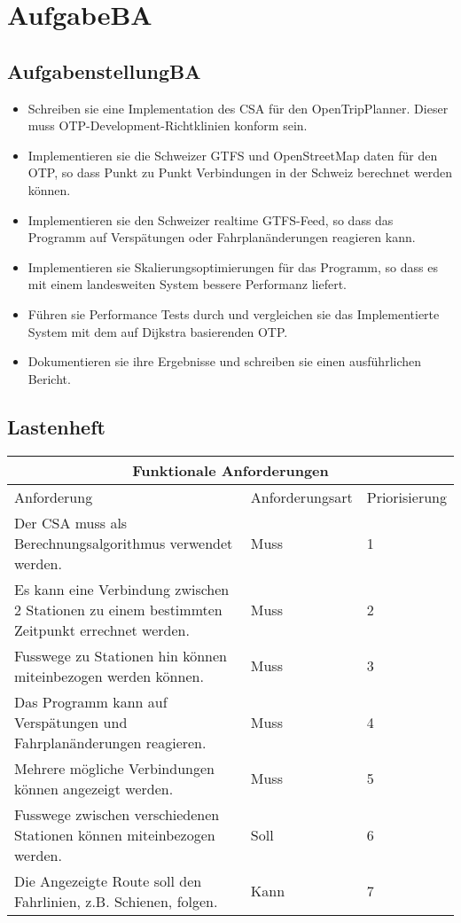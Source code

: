 \section[AufgabeBA]{AufgabeBA}
\label{AufgabeBA}


\subsection{AufgabenstellungBA}
\label{AufgabenstellungBA}
\begin{itemize}
	\item Schreiben sie eine Implementation des CSA für den OpenTripPlanner. Dieser muss OTP-Development-Richtklinien konform sein.
	\item Implementieren sie die Schweizer GTFS und OpenStreetMap daten für den OTP, so dass Punkt zu Punkt Verbindungen in der Schweiz berechnet werden können.
	\item Implementieren sie den Schweizer realtime GTFS-Feed, so dass das Programm auf Verspätungen oder Fahrplanänderungen reagieren kann.
	\item Implementieren sie Skalierungsoptimierungen für das Programm, so dass es mit einem landesweiten System bessere Performanz liefert.
	\item Führen sie Performance Tests durch und vergleichen sie das Implementierte System mit dem auf Dijkstra basierenden OTP.
	\item Dokumentieren sie ihre Ergebnisse und schreiben sie einen ausführlichen Bericht.
\end{itemize}

\subsection{Lastenheft}
\label{Lastenheft}
\begin{tabular}{ | p{5cm} | l | l | }
	\hline
	\multicolumn{3}{|c|}{Funktionale Anforderungen} \\
	\hline
	Anforderung & Anforderungsart & Priorisierung \\
	\hline
	Der CSA muss als Berechnungsalgorithmus verwendet werden. & Muss & 1 \\
	\hline
	Es kann eine Verbindung zwischen 2 Stationen zu einem bestimmten Zeitpunkt errechnet werden. & Muss & 2 \\
	\hline
	Fusswege zu Stationen hin können miteinbezogen werden können. & Muss & 3 \\
	\hline
	Das Programm kann auf Verspätungen und Fahrplanänderungen reagieren. & Muss & 4 \\
	\hline
	Mehrere mögliche Verbindungen können angezeigt werden. & Muss & 5 \\
	\hline
	Fusswege zwischen verschiedenen Stationen können miteinbezogen werden. & Soll & 6 \\
	\hline
	Die Angezeigte Route soll den Fahrlinien, z.B. Schienen, folgen. & Kann & 7 \\
	\hline
\end{tabular}


